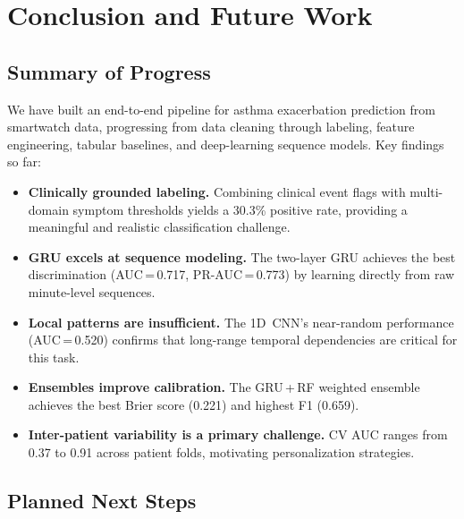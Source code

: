 \documentclass[11pt,a4paper]{article}
\begin{document}
\section{Conclusion and Future Work}\label{sec:conclusion}

\subsection{Summary of Progress}

We have built an end-to-end pipeline for asthma exacerbation prediction from
smartwatch data, progressing from data cleaning through labeling,
feature engineering, tabular baselines, and deep-learning sequence models.
Key findings so far:

\begin{itemize}[nosep]
  \item \textbf{Clinically grounded labeling.}  Combining clinical event flags
        with multi-domain symptom thresholds yields a 30.3\% positive rate,
        providing a meaningful and realistic classification challenge.
  \item \textbf{GRU excels at sequence modeling.}  The two-layer GRU achieves
        the best discrimination (AUC\,=\,0.717, PR-AUC\,=\,0.773) by
        learning directly from raw minute-level sequences.
  \item \textbf{Local patterns are insufficient.}  The 1D~CNN's near-random
        performance (AUC\,=\,0.520) confirms that long-range temporal
        dependencies are critical for this task.
  \item \textbf{Ensembles improve calibration.}  The GRU\,+\,RF weighted
        ensemble achieves the best Brier score (0.221) and highest F1 (0.659).
  \item \textbf{Inter-patient variability is a primary challenge.}  CV AUC
        ranges from 0.37 to 0.91 across patient folds, motivating
        personalization strategies.
\end{itemize}

\subsection{Planned Next Steps}
\end{document}
